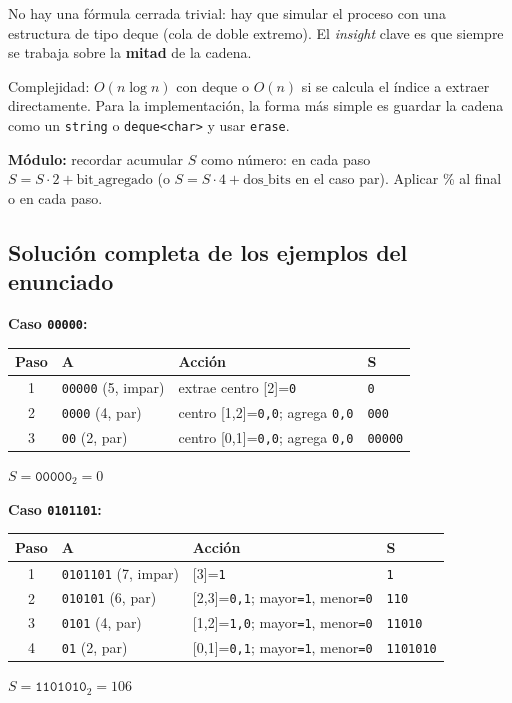 \documentclass[12pt, oneside]{article}
\begin{document}
\begin{notaprofesor}
  No hay una fórmula cerrada trivial: hay que simular el proceso con una
  estructura de tipo deque (cola de doble extremo).  El \textit{insight}
  clave es que siempre se trabaja sobre la \textbf{mitad} de la cadena.

  Complejidad: $O(n \log n)$ con deque o $O(n)$ si se calcula el índice
  a extraer directamente.  Para la implementación, la forma más simple es
  guardar la cadena como un \texttt{string} o \texttt{deque<char>} y usar
  \texttt{erase}.

  \textbf{Módulo:} recordar acumular $S$ como número: en cada paso
  $S = S \cdot 2 + \text{bit\_agregado}$ (o $S = S \cdot 4 + \text{dos\_bits}$
  en el caso par).  Aplicar \% al final o en cada paso.
\end{notaprofesor}

\subsection{Solución completa de los ejemplos del enunciado}

\textbf{Caso \texttt{00000}:}

\begin{center}
\begin{tabular}{clll}
  \toprule
  Paso & A & Acción & S \\
  \midrule
  1 & \texttt{00000} (5, impar) & extrae centro [2]=\texttt{0} & \texttt{0} \\
  2 & \texttt{0000}  (4, par)   & centro [1,2]=\texttt{0,0}; agrega \texttt{0,0} & \texttt{000} \\
  3 & \texttt{00}    (2, par)   & centro [0,1]=\texttt{0,0}; agrega \texttt{0,0} & \texttt{00000} \\
  \bottomrule
\end{tabular}
\end{center}
$S=\texttt{00000}_2=0$ \checkmark

\textbf{Caso \texttt{0101101}:}

\begin{center}
\begin{tabular}{clll}
  \toprule
  Paso & A & Acción & S \\
  \midrule
  1 & \texttt{0101101} (7, impar) & [3]=\texttt{1} & \texttt{1} \\
  2 & \texttt{010101}  (6, par)   & [2,3]=\texttt{0,1}; mayor\texttt{=1}, menor\texttt{=0} & \texttt{110} \\
  3 & \texttt{0101}    (4, par)   & [1,2]=\texttt{1,0}; mayor\texttt{=1}, menor\texttt{=0} & \texttt{11010} \\
  4 & \texttt{01}      (2, par)   & [0,1]=\texttt{0,1}; mayor\texttt{=1}, menor\texttt{=0} & \texttt{1101010} \\
  \bottomrule
\end{tabular}
\end{center}
$S=\texttt{1101010}_2=106$ \checkmark
\end{document}

